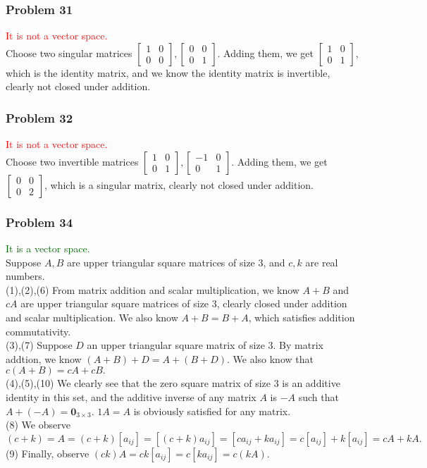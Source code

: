 \documentclass[a4paper,12pt]{article}
\begin{document}
\subsubsection*{Problem 31}
\textcolor{red}{It is not a vector space.}\\ Choose two singular matrices $\begin{bmatrix}
  1 & 0 \\
  0 & 0
\end{bmatrix}, \begin{bmatrix}
  0 & 0 \\
  0 & 1
\end{bmatrix}$. Adding them, we get $\begin{bmatrix}
  1 & 0 \\
  0 & 1
\end{bmatrix}$, which is the identity matrix, and we know the identity matrix is invertible, clearly not closed under addition.
\subsubsection*{Problem 32}
\textcolor{red}{It is not a vector space.}\\ Choose two invertible matrices $\begin{bmatrix}
  1 & 0 \\
  0 & 1
\end{bmatrix}, \begin{bmatrix}
  -1 & 0 \\
  0 & 1
\end{bmatrix}$. Adding them, we get $\begin{bmatrix}
  0 & 0 \\
  0 & 2
\end{bmatrix}$, which is a singular matrix, clearly not closed under addition.

\subsubsection*{Problem 34}
\textcolor{darkgreen}{It is a vector space.}\\
Suppose $A,B$ are upper triangular square matrices of size 3, and $c,k$ are real numbers.\\
(1),(2),(6) From matrix addition and scalar multiplication, we know $A+B$ and $cA$ are upper triangular square matrices of size 3, clearly closed under addition and scalar multiplication. We also know $A+B=B+A$, which satisfies addition commutativity.\\
(3),(7) Suppose $D$ an upper triangular square matrix of size 3. By matrix addtion, we know $(A+B)+D=A+(B+D)$. We also know that $c(A+B)=cA+cB.$\\
(4),(5),(10) We clearly see that the zero square matrix of size 3 is an additive identity in this set, and the additive inverse of any matrix $A$ is $-A$ such that $A+(-A)=\textbf{0}_{3\times 3}$. $1A=A$ is obviously satisfied for any matrix.\\
(8) We observe $(c+k)=A=(c+k)[a_{ij}]=[(c+k)a_{ij}]=[ca_{ij}+ka_{ij}]=c[a_{ij}]+k[a_{ij}]=cA+kA.$\\
(9) Finally, observe $(ck)A=ck[a_{ij}]=c[ka_{ij}]=c(kA).$
\end{document}
